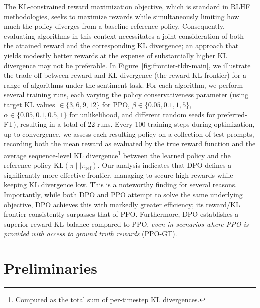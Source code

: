 The KL-constrained reward maximization objective, which is standard in RLHF methodologies, seeks to maximize rewards while simultaneously limiting how much the policy diverges from a baseline reference policy. Consequently, evaluating algorithms in this context necessitates a joint consideration of both the attained reward and the corresponding KL divergence; an approach that yields modestly better rewards at the expense of substantially higher KL divergence may not be preferable. In Figure~\ref{fig:frontier-tldr-main}, we illustrate the trade-off between reward and KL divergence (the reward-KL frontier) for a range of algorithms under the sentiment task. For each algorithm, we perform several training runs, each varying the policy conservativeness parameter (using target KL values $\in\{3,6,9,12\}$ for PPO, $\beta \in \{0.05,0.1,1,5\}$, $\alpha\in\{0.05,0.1,0.5,1\}$ for unlikelihood, and different random seeds for preferred-FT), resulting in a total of 22 runs. Every 100 training steps during optimization, up to convergence, we assess each resulting policy on a collection of test prompts, recording both the mean reward as evaluated by the true reward function and the average sequence-level KL divergence\footnote{Computed as the total sum of per-timestep KL divergences.} between the learned policy and the reference policy $\text{KL}\left(\pi\mid \mid \pi_\text{ref}\right)$. Our analysis indicates that DPO defines a significantly more effective frontier, managing to secure high rewards while keeping KL divergence low. This is a noteworthy finding for several reasons. Importantly, while both DPO and PPO attempt to solve the same underlying objective, DPO achieves this with markedly greater efficiency; its reward/KL frontier consistently surpasses that of PPO. Furthermore, DPO establishes a superior reward-KL balance compared to PPO, \emph{even in scenarios where PPO is provided with access to ground truth rewards} (PPO-GT).

\section{Preliminaries}\label{section:prelims}

